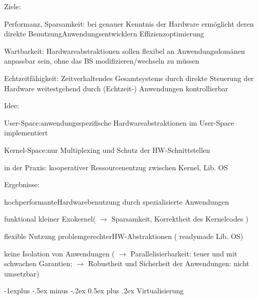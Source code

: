 \documentclass[a4paper]{article}
\makeatletter
\renewcommand{\subsection}{\@startsection{subsection}{2}{0mm}%
 {-1explus -.5ex minus -.2ex}%
 {0.5ex plus .2ex}%
 {\normalfont\normalsize\bfseries}}
\makeatother
\begin{document}
\begin{multicols}{3}
    \begin{itemize*}
        \item
        Ziele:
        \begin{itemize*}
            \item Performanz, Sparsamkeit: bei genauer Kenntnis der Hardware ermöglicht deren direkte BenutzungAnwendungsentwicklern Effizienzoptimierung
            \item Wartbarkeit: Hardwareabstraktionen sollen flexibel an Anwendungsdomänen anpassbar sein, ohne das BS modifizieren/wechseln zu müssen
            \item Echtzeitfähigkeit: Zeitverhaltendes Gesamtsystems durch direkte Steuerung der Hardware weitestgehend durch (Echtzeit-) Anwendungen kontrollierbar
        \end{itemize*}
        \item
        Idee:
        \begin{itemize*}
            \item User-Space:anwendungsspezifische Hardwareabstraktionen im User-Space implementiert
            \item Kernel-Space:nur Multiplexing und Schutz der HW-Schnittstellen
            \item in der Praxis: kooperativer Ressourcenentzug zwischen Kernel, Lib. OS
        \end{itemize*}
        \item
        Ergebnisse:
        \begin{itemize*}
            \item hochperformanteHardwarebenutzung durch spezialisierte Anwendungen
            \item funktional kleiner Exokernel( $\rightarrow$ Sparsamkeit, Korrektheit des Kernelcodes )
            \item flexible Nutzung problemgerechterHW-Abstraktionen ( readymade Lib. OS)
            \item keine Isolation von Anwendungen ( $\rightarrow$ Parallelisierbarkeit: teuer und mit schwachen Garantien; $\rightarrow$ Robustheit und Sicherheit der Anwendungen: nicht umsetzbar)
        \end{itemize*}
    \end{itemize*}


    \subsection{Virtualisierung}


\end{multicols}
\end{document}
